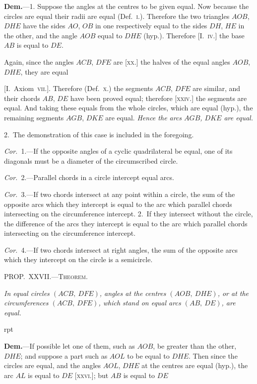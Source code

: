\documentclass[oneside]{book}
\newcounter{wrapwidth}
\newcommand\mypropl[2]{
\bigskip\Needspace*{4\baselineskip}\begin{center}\textsc{#1}\end{center}
\hspace{\parindent}\emph{#2}\par\medskip
}
\newcommand\imgflow[3]{
\setcounter{wrapwidth}{#1}

\begin{wrapfigure}[#2]{r}{\value{wrapwidth}pt}
\begin{center}
\vspace{-0.3in}

\end{center}
\end{wrapfigure}
}
\begin{document}
\textbf{Dem.}---1. Suppose the angles at the centres to be
given equal. Now because the circles are equal their
radii are equal (Def.~\textsc{i}.).
Therefore the
two triangles $AOB$,
$DHE$ have the sides
$AO$, $OB$ in one respectively
equal to
the sides $DH$, $HE$
in the other, and the
angle $AOB$ equal to
$DHE$ (hyp.). Therefore [I.~\textsc{iv.}] the base $AB$ is equal
to $DE$.

Again, since the angles $ACB$, $DFE$ are [\textsc{xx.}] the
halves of the equal angles $AOB$, $DHE$, they are equal

[I.~Axiom~\textsc{vii.}]. Therefore (Def.~\textsc{x.}) the segments
$ACB$, $DFE$ are similar, and their chords $AB$, $DE$ have
been proved equal; therefore [\textsc{xxiv.}] the segments are
equal. And taking these equals from the whole circles,
which are equal (hyp.), the remaining segments $AGB$,
$DKE$ are equal. \emph{Hence the arcs $AGB$, $DKE$ are equal.}

2.~The demonstration of this case is included in the
foregoing.

\emph{Cor.}~1.---If the opposite angles of a cyclic quadrilateral
be equal, one of its diagonals must be a diameter
of the circumscribed circle.

\emph{Cor.}~2.---Parallel chords in a circle intercept equal
arcs.

\emph{Cor.}~3.---If two chords intersect at any point within
a circle, the sum of the opposite arcs which they intercept
is equal to the arc which parallel chords intersecting
on the circumference intercept. 2.~If they
intersect without the circle, the difference of the arcs
they intercept is equal to the arc which parallel chords
intersecting on the circumference intercept.

\emph{Cor.}~4.---If two chords intersect at right angles, the
sum of the opposite arcs which they intercept on the
circle is a semicircle.

\mypropl{PROP\@.~XXVII\@.---Theorem.}{In equal circles $(ACB,\ DFE)$, angles at the centres
$(AOB,\ DHE)$, or at the circumferences $(ACB,\ DFE)$,
which stand on equal arcs $(AB,\ DE)$, are equal.}


\imgflow{190}{9}{f134}

\textbf{Dem.}---If possible let one of them, such as $AOB$,
be greater than the
other, $DHE$; and
suppose a part such
as $AOL$ to be equal
to $DHE$. Then since
the circles are equal,
and the angles $AOL$,
$DHE$ at the centres
are equal (hyp.), the
arc $AL$ is equal to $DE$ [\textsc{xxvi.}]; but $AB$ is equal to $DE$
\end{document}
